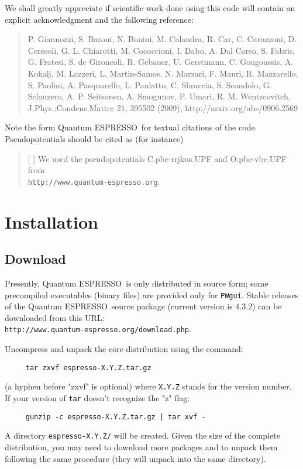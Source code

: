 \documentclass[12pt,a4paper]{article}
\def\version{4.3.2}
\def\qe{{\sc Quantum ESPRESSO}}
\begin{document}
We shall greatly appreciate if scientific work done using this code will 
contain an explicit acknowledgment and the following reference:
\begin{quote}
P. Giannozzi, S. Baroni, N. Bonini, M. Calandra, R. Car, C. Cavazzoni,
D. Ceresoli, G. L. Chiarotti, M. Cococcioni, I. Dabo, A. Dal Corso,
S. Fabris, G. Fratesi, S. de Gironcoli, R. Gebauer, U. Gerstmann,
C. Gougoussis, A. Kokalj, M. Lazzeri, L. Martin-Samos, N. Marzari,
F. Mauri, R. Mazzarello, S. Paolini, A. Pasquarello, L. Paulatto,
C. Sbraccia, S. Scandolo, G. Sclauzero, A. P. Seitsonen, A. Smogunov,
P. Umari, R. M. Wentzcovitch, J.Phys.:Condens.Matter 21, 395502 (2009),
http://arxiv.org/abs/0906.2569
\end{quote}
Note the form \qe\ for textual citations of the code.
Pseudopotentials should be cited as (for instance)
\begin{quote}
[ ] We used the pseudopotentials C.pbe-rrjkus.UPF
and O.pbe-vbc.UPF from\\
\texttt{http://www.quantum-espresso.org}.
\end{quote}
\section{Installation}

\subsection{Download}
 
Presently, \qe\ is only distributed in source form; 
some precompiled executables (binary files) are provided only for 
\texttt{PWgui}. 
Stable releases of the \qe\ source package (current version 
is \version) can be downloaded from this URL: \\
\texttt{http://www.quantum-espresso.org/download.php}.

Uncompress and unpack the core distribution using the command:
\begin{verbatim}
     tar zxvf espresso-X.Y.Z.tar.gz
\end{verbatim}
(a hyphen before "zxvf" is optional) where \texttt{X.Y.Z} stands for the
version number. If your version of \texttt{tar} 
doesn't recognize the "z" flag:
\begin{verbatim}
     gunzip -c espresso-X.Y.Z.tar.gz | tar xvf -
\end{verbatim}
A directory \texttt{espresso-X.Y.Z/} will be created. Given the size 
of the complete distribution, you may need to download more packages
and to unpack them following the same procedure (they will unpack into 
the same directory). 
\end{document}
